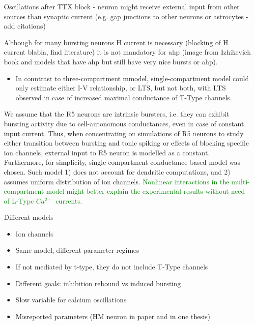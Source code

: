 \documentclass[../main.tex]{subfiles}
\begin{document}
\color{black}


    


Oscillations after TTX block - neuron might receive external input from other sources
than synaptic current (e.g. gap junctions to other neurons or astrocytes - add citations)

Although for many bursting neurons H current is necessary (blocking of H current blabla, find literature)
it is not mandatory for \gls{ahp} (image from Izhikevich book and models that have ahp but still
have very nice bursts or ahp).

\begin{itemize}
    \item In conntrast to three-compartment mmodel, single-compartment model could only estimate either I-V relationship, or LTS, but not both,
    with LTS observed in case of increased maximal conductance of T-Type channels. \parencite{destexheDendriticLowthresholdCalcium1998}
\end{itemize}


We assume that the R5 neurons are intrinsic bursters, i.e. they can exhibit bursting activity due to
cell-autonomous conductances, even in case of constant input current.
Thus, when concentrating on simulations of R5 neurons to study either transition between
bursting and tonic spiking or effects of blocking specific ion channels, external input to R5 neuron
is modelled as a constant. Furthermore, for simplicity, single compartment conductance based model was chosen.
Such model 1) does not account for dendritic computations, and 2) assumes uniform distribution of
ion channels. \textcolor{green}{Nonlinear interactions in the multi-compartment model might better explain
the experimental results without need of L-Type $Ca^{2+}$ currents.}

Different models
\begin{itemize}
    \item Ion channels
    \item Same model, different parameter regimes
    \item If not mediated by t-type, they do not include T-Type channels
    \item Different goals: inhibition rebound vs induced bursting
    \item Slow variable for calcium oscillations
    \item Misreported parameters (HM neuron in paper and in one thesis)
\end{itemize}
\end{document}
